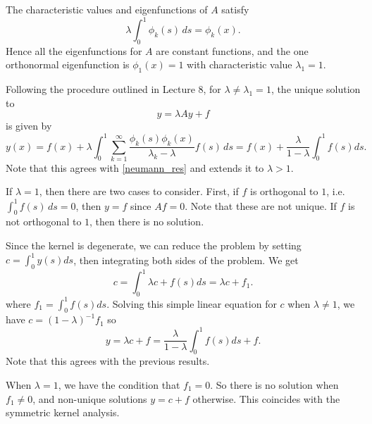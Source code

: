 \documentclass{homework}
\begin{document}

  \begin{solution}
    The characteristic values and eigenfunctions of $A$ satisfy
    $$
      \lambda \int_0^1 \phi_k(s)\, ds = \phi_k(x).
    $$
    Hence all the eigenfunctions for $A$ are constant functions, and the one orthonormal
    eigenfunction is $\phi_1(x) = 1$ with characteristic value $\lambda_1 = 1$. 
    
    Following the procedure outlined in Lecture 8, for $\lambda \not= \lambda_1 = 1$, the unique solution to
    $$
      y = \lambda A y + f
    $$
    is given by
    $$
      y(x) = f(x) +  \lambda \int_0^1 \sum_{k=1}^\infty \frac {\phi_k(s)\phi_k(x)}{\lambda_k-\lambda} f(s)\, ds = f(x) + \frac{\lambda}{1-\lambda} \int_0^1 f(s) ds.
    $$
    Note that this agrees with \eqref{neumann_res} and extends it to $\lambda > 1$.

    If $\lambda = 1$, then there are two cases to consider.  First, if $f$ is orthogonal to $1$, i.e.  $ \int_0^1 f(s)\, ds = 0 $, then $y = f$ since $Af = 0$.  Note that these are not unique. If $f$ is not orthogonal to $1$, then there is no solution.
    \end{solution}


  \begin{solution}
    Since the kernel is degenerate, we can reduce the problem by setting $c = \int_0^1 y(s)ds$, then integrating both sides of the problem. We get
    $$
      c = \int_0^1 \lambda c + f(s) ds = \lambda c + f_1.
    $$
    where $f_1 = \int_0^1f(s)ds$. Solving this simple linear equation for $c$ when $\lambda \not= 1$, we have $c = (1 - \lambda)^{-1} f_1 $
    so 
    \begin{equation}
      y = \lambda c + f = \frac{\lambda}{1-\lambda} \int_0^1 f(s) ds + f.
    \end{equation}
    Note that this agrees with the previous results.

    When $\lambda =1$, we have the condition that $f_1 = 0$.  So there is no solution when $f_1 \not=0$, and non-unique solutions $y = c + f$ otherwise.  This coincides with the symmetric kernel analysis.
    \vspace{-1em}
  \end{solution}
  \newpage

\end{document}

